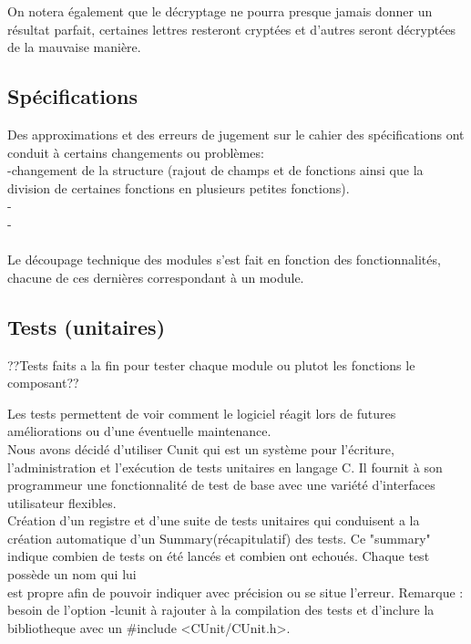\documentclass[a4]{article}
\begin{document}
    On notera également que le décryptage ne pourra presque jamais donner un résultat parfait, certaines lettres resteront 
    cryptées et d'autres seront décryptées de la mauvaise manière. 
		
		\subsection{Spécifications}
		Des approximations et des erreurs de jugement sur le cahier des spécifications ont conduit à certains changements ou problèmes:\\
		-changement de la structure (rajout de champs et de fonctions ainsi que la division de certaines fonctions en plusieurs
		 petites fonctions).\\
		
    -\\
		
    -\\ \\
		

		Le découpage technique des modules s'est fait en fonction des fonctionnalités, chacune de ces dernières correspondant 
    à un module.
		
		\subsection{Tests (unitaires)}
??Tests faits a la fin pour tester chaque module ou plutot les fonctions le composant?? 		

Les tests permettent de voir comment le logiciel réagit lors de futures améliorations ou d'une éventuelle maintenance. \\ 
 
Nous avons décidé d'utiliser Cunit qui est un système pour l'écriture, l'administration et l'exécution de tests unitaires
en langage C. Il fournit à son programmeur une fonctionnalité de test de base avec une variété d'interfaces utilisateur flexibles.\\
Création d'un registre et d'une suite de tests unitaires qui conduisent a la création automatique d'un Summary(récapitulatif)
des tests. Ce "summary" indique combien de tests on été lancés et combien ont echoués. Chaque test possède un nom qui lui\\
est propre afin de pouvoir indiquer avec précision ou se situe l'erreur.
Remarque : besoin de l'option -lcunit à rajouter à la compilation des tests et d'inclure la bibliotheque avec un
\#include <CUnit/CUnit.h>.\\ \\ \\ 
\end{document}
